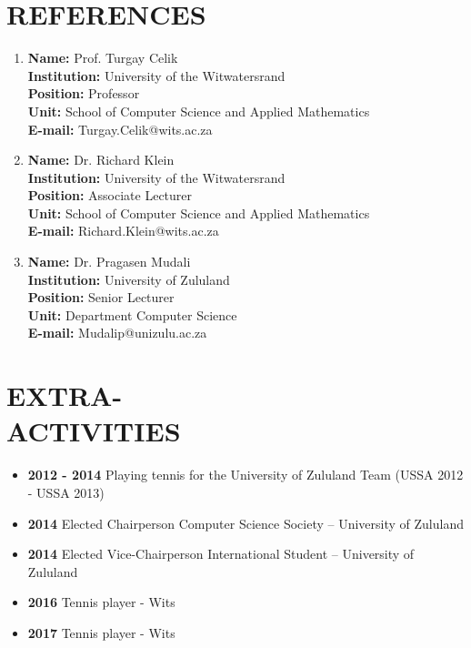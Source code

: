 \documentclass[margin]{res}
\begin{document}
\begin{resume}
\section{REFERENCES}
\begin{enumerate}
\item \textbf{Name:} Prof. Turgay Celik\\
\textbf{Institution:} University of the Witwatersrand\\
\textbf{Position:} Professor\\
\textbf{Unit:} School of Computer Science and Applied Mathematics\\
\textbf{E-mail:} Turgay.Celik@wits.ac.za
\\
\item \textbf{Name:} Dr. Richard Klein\\ 
\textbf{Institution:} University of the Witwatersrand\\
\textbf{Position:} Associate Lecturer\\
\textbf{Unit:} School of Computer Science and Applied Mathematics\\
\textbf{E-mail:} Richard.Klein@wits.ac.za
\\
\item \textbf{Name:} Dr. Pragasen Mudali\\ 
\textbf{Institution:} University of Zululand\\
\textbf{Position:} Senior Lecturer\\
\textbf{Unit:} Department Computer Science\\
\textbf{E-mail:} Mudalip@unizulu.ac.za
\end{enumerate}



\section{EXTRA-\\ACTIVITIES}
\begin{itemize}
\item \textbf{2012 - 2014} Playing tennis for the University of Zululand Team (USSA 2012 - USSA 2013)
\item \textbf{2014} Elected Chairperson Computer Science Society – University of Zululand
\item \textbf{2014} Elected Vice-Chairperson International Student – University of Zululand
\item \textbf{2016} Tennis player - Wits
\item \textbf{2017} Tennis player - Wits
\end{itemize}


\end{resume}
\end{document}
